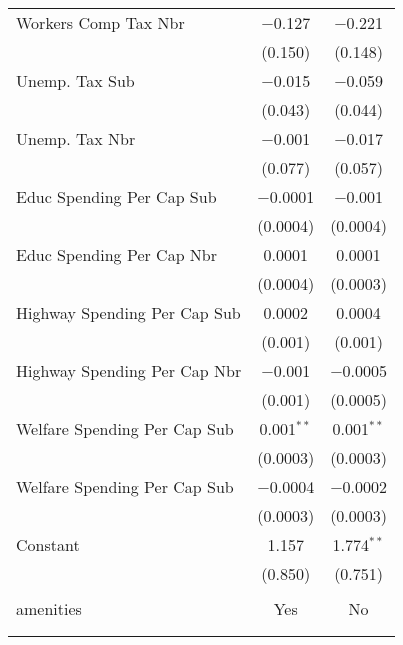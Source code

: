 \begin{table}[!htbp]
\begin{tabular}{@{\extracolsep{5pt}}lcc}
  Workers Comp Tax Nbr & $-$0.127 & $-$0.221 \\ 
  & (0.150) & (0.148) \\ 
  Unemp. Tax Sub & $-$0.015 & $-$0.059 \\ 
  & (0.043) & (0.044) \\ 
  Unemp. Tax Nbr & $-$0.001 & $-$0.017 \\ 
  & (0.077) & (0.057) \\ 
  Educ Spending Per Cap Sub & $-$0.0001 & $-$0.001 \\ 
  & (0.0004) & (0.0004) \\ 
  Educ Spending Per Cap Nbr & 0.0001 & 0.0001 \\ 
  & (0.0004) & (0.0003) \\ 
  Highway Spending Per Cap Sub & 0.0002 & 0.0004 \\ 
  & (0.001) & (0.001) \\ 
  Highway Spending Per Cap Nbr & $-$0.001 & $-$0.0005 \\ 
  & (0.001) & (0.0005) \\ 
  Welfare Spending Per Cap Sub & 0.001$^{**}$ & 0.001$^{**}$ \\ 
  & (0.0003) & (0.0003) \\ 
  Welfare Spending Per Cap Sub & $-$0.0004 & $-$0.0002 \\ 
  & (0.0003) & (0.0003) \\ 
  Constant & 1.157 & 1.774$^{**}$ \\ 
  & (0.850) & (0.751) \\ 
 \hline \\[-1.8ex] 
amenities & Yes & No \\ 
\hline \\[-1.8ex] 
\hline 
\hline \\[-1.8ex] 
\end{tabular} 
\end{table} 
